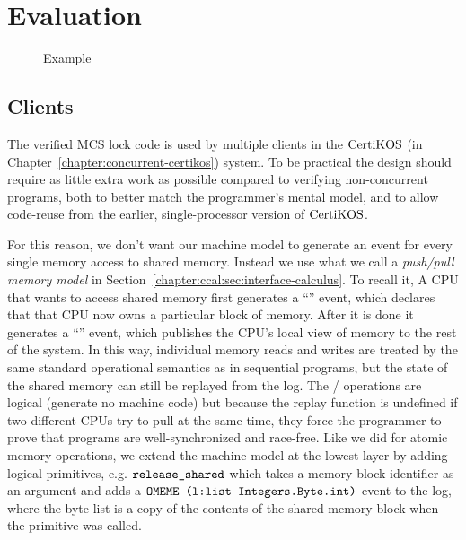 
\section{Evaluation}
\label{sec:evaluation}

\begin{figure}
\begin{minipage}{\linewidth}
\noindent
\begin{multicols}{2}


\end{multicols}
\end{minipage}
\caption{ Example}
\label{fig:chapter:mcslock:palloc-example}
\end{figure}

\subsection{Clients}

The verified MCS lock code is used by multiple clients in the $\mathrm{CertiKOS}$ (in Chapter~\ref{chapter:concurrent-certikos})
system. To be practical the design should require as little extra work
as possible compared to verifying non-concurrent programs, both to
better match the programmer's mental model, and to allow code-reuse
from the earlier, single-processor version of $\mathrm{CertiKOS}$.

For this reason, we don't want our machine model to generate an event
for every single memory access to shared memory. Instead we use what
we call a \emph{push/pull memory model} in Section~\ref{chapter:ccal:sec:interface-calculus}.
To recall it,
 A CPU that wants to access shared memory first generates a ``''
event, which declares that that CPU now owns a particular block of
memory. After it is done it generates a ``'' event, which
publishes the CPU's local view of memory to the rest of the system. In
this way, individual memory reads and writes are treated by the same
standard operational semantics as in sequential programs, but the
state of the shared memory can still be replayed from the log.  The
/ operations are logical (generate no machine code) but
because the replay function is undefined if two different CPUs try to
pull at the same time, they force the programmer to prove that
programs are well-synchronized and race-free. Like we did for atomic
memory operations, we extend the machine model at the lowest layer by
adding logical primitives, e.g. ${\mathrm{\texttt{release\_shared}}}$ which takes a
memory block identifier as an argument and adds a
${\mathrm{\texttt{OMEME (l:list Integers.Byte.int)}}}$ event to the log, where the byte list is a
copy of the contents of the shared memory block when the primitive was
called.

